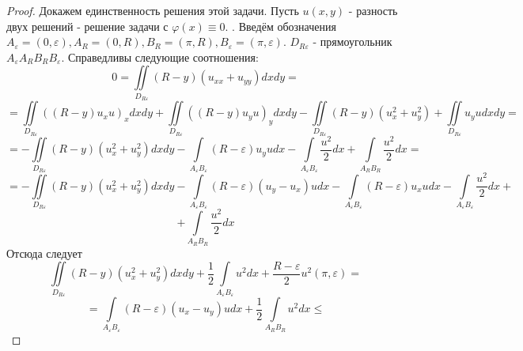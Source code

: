 \documentclass[a4paper, 9pt]{article}
\begin{document}
	\begin{proof}
		Докажем единственность решения этой задачи. Пусть $u(x,y)$ - разность двух решений - решение задачи с $\varphi(x) \equiv 0$. .\newline
		Введём обозначения $A_\varepsilon = (0, \varepsilon), A_R = (0, R), B_R = (\pi, R), B_\varepsilon = (\pi, \varepsilon)$. $D_{R\varepsilon}$ - прямоугольник $A_\varepsilon A_R B_R B_\varepsilon$. Справедливы следующие соотношения:
		\begin{equation*}
			0 = \iint\limits_{D_{R\varepsilon}} (R-y) (u_{xx} + u_{yy}) dx dy = 
		\end{equation*}
		\begin{equation*}
			=	\iint\limits_{D_{R\varepsilon}} \left( \left(R - y\right) u_x u\right)_x dx dy  + \iint\limits_{D_{R\varepsilon}} \left( \left(R - y\right) u_y u\right)_y dx dy  
			- \iint\limits_{D_{R\varepsilon}} \left(R- y\right) \left(u_x^2 + u_y^2\right) + \iint\limits_{D_{R\varepsilon}} u_y u dx dy = 
		\end{equation*}
		\begin{equation*}
			= - \iint\limits_{D_{R\varepsilon}} \left(R - y\right) \left(u_x^2 + u_y^2\right) dx dy
			- \int\limits_{A_\varepsilon B_\varepsilon} \left(R - \varepsilon\right) u_y u dx 
			-\int\limits_{A_\varepsilon B_\varepsilon} \dfrac{u^2}{2} dx + \int\limits_{A_R B_R} \dfrac{u^2}{2} dx = 
		\end{equation*}
		\begin{equation*}
			= - \iint\limits_{D_{R\varepsilon}} \left(R - y\right) \left(u_x^2 + u_y^2\right) dx dy - 
			\int\limits_{A_\varepsilon B_\varepsilon} \left(R - \varepsilon \right) \left(u_y - u_x\right)u dx - \int\limits_{A_\varepsilon B_\varepsilon} \left(R - \varepsilon\right) u_x u dx - \int\limits_{A_\varepsilon B_\varepsilon}\dfrac{u^2}{2} dx +
		\end{equation*}
		\begin{equation*}
			+ \int\limits_{A_R B_R} \dfrac{u^2}{2}dx
		\end{equation*}
		Отсюда следует
		\begin{equation*}
			\iint\limits_{D_{R\varepsilon}} \left(R - y\right) \left(u_x^2 + u_y^2\right) dx dy + \dfrac{1}{2}\int\limits_{A_\varepsilon B_\varepsilon} u^2 dx +\dfrac{R - \varepsilon}{2}u^2(\pi, \varepsilon)  =
		\end{equation*}
		\begin{equation*}
			= \int\limits_{A_\varepsilon B_\varepsilon} \left(R - \varepsilon \right) \left(u_x - u_y\right)u dx + \dfrac12  \int\limits_{A_R B_R} u^2 dx \leq

\end{equation*}
\end{proof}
\end{document}
